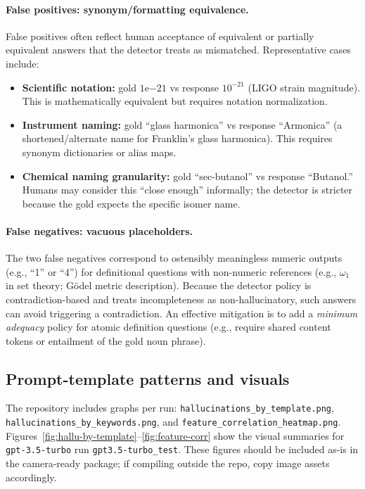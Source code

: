 \documentclass[11pt]{article}
\newcommand{\model}[1]{\texttt{#1}}
\begin{document}
\paragraph{False positives: synonym/formatting equivalence.}
False positives often reflect human acceptance of equivalent or partially equivalent answers that the detector treats as mismatched.
Representative cases include:
\begin{itemize}[leftmargin=1.4em]
  \item \textbf{Scientific notation:} gold \(1\mathrm{e}{-21}\) vs response \(10^{-21}\) (LIGO strain magnitude). This is mathematically equivalent but requires notation normalization.
  \item \textbf{Instrument naming:} gold ``glass harmonica'' vs response ``Armonica'' (a shortened/alternate name for Franklin’s glass harmonica). This requires synonym dictionaries or alias maps.
  \item \textbf{Chemical naming granularity:} gold ``sec-butanol'' vs response ``Butanol.'' Humans may consider this ``close enough'' informally; the detector is stricter because the gold expects the specific isomer name.
\end{itemize}

\paragraph{False negatives: vacuous placeholders.}
The two false negatives correspond to ostensibly meaningless numeric outputs (e.g., ``1'' or ``4'') for definitional questions with non-numeric references (e.g., \(\omega_1\) in set theory; Gödel metric description). Because the detector policy is contradiction-based and treats incompleteness as non-hallucinatory, such answers can avoid triggering a contradiction. An effective mitigation is to add a \emph{minimum adequacy} policy for atomic definition questions (e.g., require shared content tokens or entailment of the gold noun phrase).

\subsection{Prompt-template patterns and visuals}
The repository includes graphs per run:
\texttt{hallucinations\_by\_template.png}, \texttt{hallucinations\_by\_keywords.png}, and \texttt{feature\_correlation\_heatmap.png}. Figures~\ref{fig:hallu-by-template}--\ref{fig:feature-corr} show the visual summaries for \model{gpt-3.5-turbo} run \texttt{gpt3.5-turbo\_test}. These figures should be included as-is in the camera-ready package; if compiling outside the repo, copy image assets accordingly.
\end{document}
